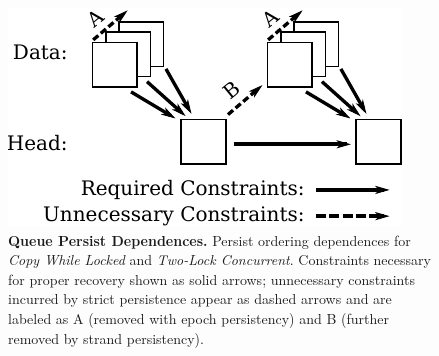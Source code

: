\begin{figure}
  \centering
  \includegraphics[width=.55\linewidth]{PersistencyModels/CWL_2LC_dependences.pdf}
  \caption{\textbf{Queue Persist Dependences.} Persist ordering dependences for \emph{Copy While Locked} and \emph{Two-Lock Concurrent}.  Constraints necessary for proper recovery shown as solid arrows; unnecessary constraints incurred by strict persistence appear as dashed arrows and are labeled as A (removed with epoch persistency) and B (further removed by strand persistency).}
  \label{fig::CWL_dependences}
\end{figure}
